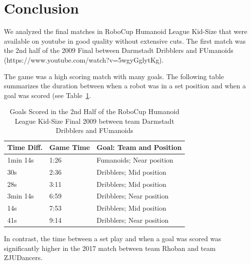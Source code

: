 \documentclass[runningheads]{llncs}
\begin{document}
\section{Conclusion}
\label{sec:conclusion}

We analyzed the final matches in RoboCup Humanoid League Kid-Size that were available on youtube in good quality without extensive cuts. The first match was the 2nd half of the 2009 Final between Darmstadt Dribblers and FUmanoids (https://www.youtube.com/watch?v=5wgyGglytKg).

The game was a high scoring match with many goals. 
The following table summarizes the duration between when a robot was in a set position and when a goal was scored (see Table~\ref{tab:2009kid}. 

\begin{table}[]
    \centering
    \caption{Goals Scored in the 2nd Half of the RoboCup Humanoid League Kid-Size Final 2009 between team Darmstadt Dribblers and FUmanoids}
    \label{tab:2009kid}
\begin{tabular}{|l|l|l|}
\hline 
Time Diff. & Game Time & Goal: Team and Position\\
\hline
1min 14s & 1:26 & Fumanoids; Near position\\	
30s	& 2:36 & Dribblers; Mid position\\	
28s	& 3:11 & Dribblers; Mid position\\	
3min 14s & 6:59	& Dribblers; Near position\\	
14s	& 7:53 & Dribblers; Mid position\\
41s	& 9:14 & Dribblers; Near position\\
\hline
\end{tabular}
\end{table}

In contrast, the time between a set play and when a goal was scored was significantly higher in the 2017 match between team Rhoban and team ZJUDancers.

%
%
%


\end{document}
